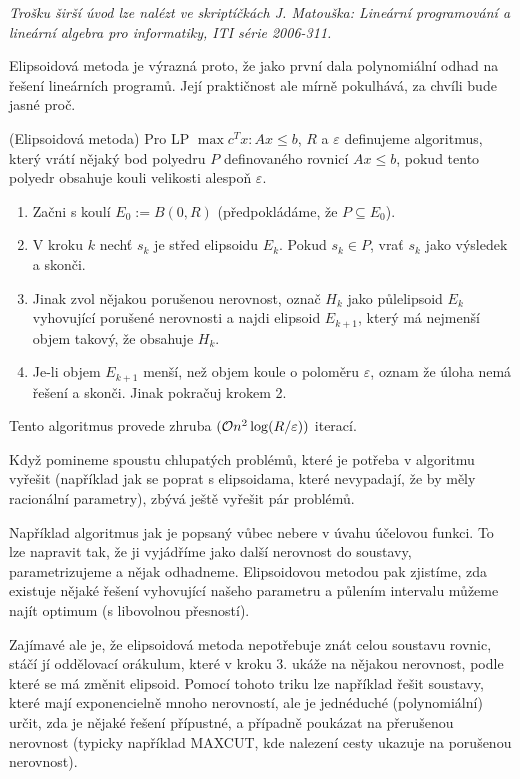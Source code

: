{\it Trošku širší úvod lze nalézt ve skriptíčkách J. Matouška: Lineární
programování a lineární algebra pro informatiky, ITI série 2006-311.}

Elipsoidová metoda je výrazná proto, že jako první dala polynomiální odhad na
řešení lineárních programů. Její praktičnost ale mírně pokulhává, za chvíli bude
jasné proč.

\alg (Elipsoidová metoda) Pro LP $\max c^Tx: Ax \leq b$, $R$ a $\varepsilon$
definujeme algoritmus, který vrátí nějaký bod polyedru $P$ definovaného rovnicí $Ax \leq b$,
pokud tento polyedr obsahuje kouli velikosti alespoň $\varepsilon$.
\begin{enumerate}
	\item Začni s koulí $E_0 := B(0, R)$ (předpokládáme, že $P \subseteq E_0$).
	\item V kroku $k$ nechť $s_k$ je střed elipsoidu $E_k$. Pokud $s_k \in P$,
	vrať $s_k$ jako výsledek a skonči.
	\item Jinak zvol nějakou porušenou nerovnost, označ $H_k$ jako půlelipsoid
	$E_k$ vyhovující porušené nerovnosti a najdi elipsoid $E_{k+1}$, který má
	nejmenší objem takový, že obsahuje $H_k$.
	\item Je-li objem $E_{k+1}$ menší, než objem koule o poloměru $\varepsilon$,
	oznam že úloha nemá řešení a skonči. Jinak pokračuj krokem 2.
\end{enumerate}
Tento algoritmus provede zhruba $(\mathcal{O} n^2\log (R/\varepsilon))$ iterací.

Když pomineme spoustu chlupatých problémů, které je potřeba v algoritmu vyřešit
(například jak se poprat s elipsoidama, které nevypadají, že by měly racionální
parametry), zbývá ještě vyřešit pár problémů. 

Například algoritmus jak je popsaný vůbec nebere v úvahu účelovou funkci. To lze
napravit tak, že ji vyjádříme jako další nerovnost do soustavy, parametrizujeme
a nějak odhadneme. Elipsoidovou metodou pak zjistíme, zda existuje nějaké řešení
vyhovující našeho parametru a půlením intervalu můžeme najít optimum (s
libovolnou přesností).

Zajímavé ale je, že elipsoidová metoda nepotřebuje znát celou soustavu rovnic,
stáčí jí oddělovací orákulum, které v kroku 3. ukáže na nějakou nerovnost, podle
které se má změnit elipsoid. Pomocí tohoto triku lze například řešit soustavy,
které mají exponencielně mnoho nerovností, ale je jednéduché (polynomiální)
určit, zda je nějaké řešení přípustné, a případně poukázat na přerušenou
nerovnost (typicky například MAXCUT, kde nalezení cesty ukazuje na porušenou
nerovnost).
